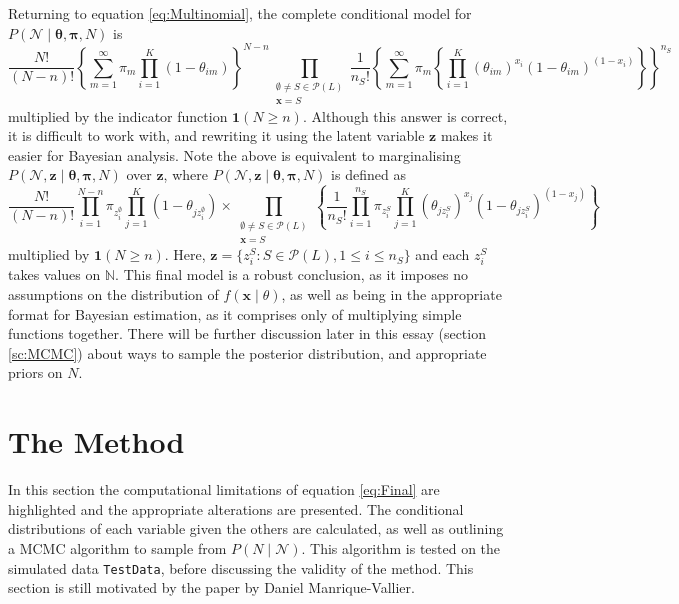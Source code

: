 \documentclass[10pt,a4paper,notitlepage]{article}
\newcommand{\N}{\mathbb{N}}
\newcommand{\x}{\textbf{x}}
\begin{document}
Returning to equation \eqref{eq:Multinomial}, the complete conditional model for $P(\mathcal{N}\mid\bm{\theta},\bm{\pi}, N)$ is 
\begin{equation}
\frac{N!}{(N-n)!}\left\lbrace \sum_{m=1}^{\infty}\pi_{m}\prod_{i=1}^{K}(1-\theta_{im})\right\rbrace^{N-n}\prod_{\substack{\emptyset\neq S\in\mathcal{P}(L)\\ \x=S}} \frac{1}{n_{S}!}\left\lbrace\sum_{m=1}^{\infty}\pi_{m}\left\lbrace\prod_{i=1}^{K}\left(\theta_{im}\right)^{x_{i}}\left(1-\theta_{im}\right)^{(1-x_{i})}\right\rbrace\right\rbrace^{n_{S}}
\end{equation}
multiplied by the indicator function $\mathbf{1}(N\geq n)$. Although this answer is correct, it is difficult to work with, and rewriting it using the latent variable $\mathbf{z}$ makes it easier for Bayesian analysis. Note the above is equivalent to marginalising $P(\mathcal{N},\mathbf{z}\mid\bm{\theta},\bm{\pi},N)$ over $\mathbf{z}$, where $P(\mathcal{N},\mathbf{z}\mid\bm{\theta},\bm{\pi},N)$ is defined as
\begin{equation}\label{eq:Final}
\frac{N!}{(N-n)!}\prod_{i=1}^{N-n}\pi_{z^{\emptyset}_{i}}\prod_{j=1}^{K}(1-\theta_{jz^{\emptyset}_{i}})\times\prod_{\substack{\emptyset\neq S\in\mathcal{P}(L)\\ \x=S}}\left\lbrace\frac{1}{n_{S}!}\prod_{i=1}^{n_{S}}\pi_{z^{S}_{i}}\prod_{j=1}^{K}(\theta_{jz^{S}_{i}})^{x_{j}}(1-\theta_{jz^{S}_{i}})^{(1-x_{j})}\right\rbrace
\end{equation}
multiplied by $\mathbf{1}(N\geq n)$. Here, $\mathbf{z}=\{z^{S}_{i}:S\in\mathcal{P}(L), 1\leq i\leq n_{S}\}$ and each $z^{S}_{i}$ takes values on $\N$.  
This final model is a robust conclusion, as it imposes no assumptions on the distribution of $f(\x\mid\theta)$, as well as being in the appropriate format for Bayesian estimation, as it comprises only of multiplying simple functions together. There will be further discussion later in this essay (section \ref{sc:MCMC}) about ways to sample the posterior distribution, and appropriate priors on $N$.

\section{The Method}\label{sc:4}
In this section the computational limitations of equation \eqref{eq:Final} are highlighted and the appropriate alterations are presented. The conditional distributions of each variable given the others are calculated, as well as outlining a MCMC algorithm to sample from $P(N\mid\mathcal{N})$. This algorithm is tested on the simulated data \texttt{TestData}, before discussing the validity of the method. This section is still motivated by the paper \cite{BayesianMixing} by Daniel Manrique-Vallier.
\end{document}
